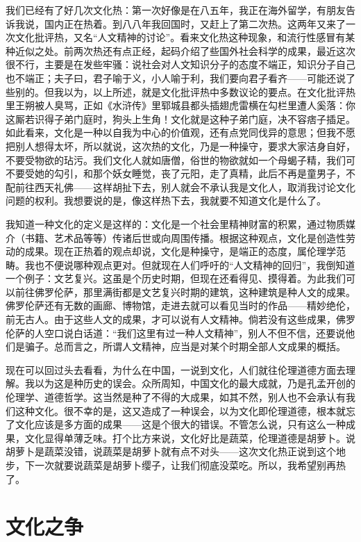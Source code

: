 我们已经有了好几次文化热：第一次好像是在八五年，我正在海外留学，有朋友告诉我说，国内正在热着。到八八年我回国时，又赶上了第二次热。这两年又来了一次文化批评热，又名“人文精神的讨论”。看来文化热这种现象，和流行性感冒有某种近似之处。前两次热还有点正经，起码介绍了些国外社会科学的成果，最近这次很不行，主要是在发些牢骚：说社会对人文知识分子的态度不端正，知识分子自己也不端正；夫子曰，君子喻于义，小人喻于利，我们要向君子看齐——可能还说了些别的。但我以为，以上所述，就是文化批评热中多数议论的要点。在文化批评热里王朔被人臭骂，正如《水浒传》里郓城县都头插翅虎雷横在勾栏里遭人奚落：你这厮若识得子弟门庭时，狗头上生角！文化就是这种子弟门庭，决不容痞子插足。如此看来，文化是一种以自我为中心的价值观，还有点党同伐异的意思；但我不愿把别人想得太坏，所以就说，这次热的文化，乃是一种操守，要求大家洁身自好，不要受物欲的玷污。我们文化人就如唐僧，俗世的物欲就如一个母蝎子精，我们可不要受她的勾引，和那个妖女睡觉，丧了元阳，走了真精，此后不再是童男子，不配前往西天礼佛——这样胡扯下去，别人就会不承认我是文化人，取消我讨论文化问题的权利。我想要说的是，像这样热下去，我就要不知道文化是什么了。 

我知道一种文化的定义是这样的：文化是一个社会里精神财富的积累，通过物质媒介（书籍、艺术品等等）传诸后世或向周围传播。根据这种观点，文化是创造性劳动的成果。现在正热着的观点却说，文化是种操守，是端正的态度，属伦理学范畴。我也不便说哪种观点更对。但就现在人们呼吁的“人文精神的回归”，我倒知道一个例子：文艺复兴。这虽是个历史时期，但现在还看得见、摸得着。为此我们可以前往佛罗伦萨，那里满街都是文艺复兴时期的建筑，这种建筑是种人文的成果。佛罗伦萨还有无数的画廊、博物馆，走进去就可以看见当时的作品——精妙绝伦，前无古人。由于这些人文的成果，才可以说有人文精神。倘若没有这些成果，佛罗伦萨的人空口说白话道：“我们这里有过一种人文精神”，别人不但不信，还要说他们是骗子。总而言之，所谓人文精神，应当是对某个时期全部人文成果的概括。 

现在可以回过头去看看，为什么在中国，一说到文化，人们就往伦理道德方面去理解。我以为这是种历史的误会。众所周知，中国文化的最大成就，乃是孔孟开创的伦理学、道德哲学。这当然是种了不得的大成果，如其不然，别人也不会承认有我们这种文化。很不幸的是，这又造成了一种误会，以为文化即伦理道德，根本就忘了文化应该是多方面的成果——这是个很大的错误。不管怎么说，只有这么一种成果，文化显得单薄乏味。打个比方来说，文化好比是蔬菜，伦理道德是胡萝卜。说胡萝卜是蔬菜没错，说蔬菜是胡萝卜就有点不对头——这次文化热正说到这个地步，下一次就要说蔬菜是胡萝卜缨子，让我们彻底没菜吃。所以，我希望别再热了。

\chapter{文化之争}

